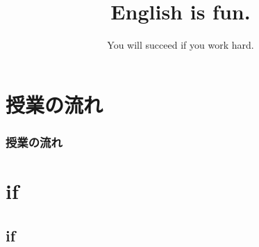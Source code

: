 \documentclass[aspectratio=169,xcolor={dvipsnames,table}]{beamer}
\title{English is fun.}
\subtitle{You will succeed if you work hard.}
\author{}
\institute[]{}
\date[]
\begin{document}
\begin{frame}[plain]
  \titlepage
\end{frame}

\section*{授業の流れ}
\begin{frame}[plain]
  \frametitle{授業の流れ}
  \tableofcontents
\end{frame}

\section{if }
\subsection{if}
\end{document}
